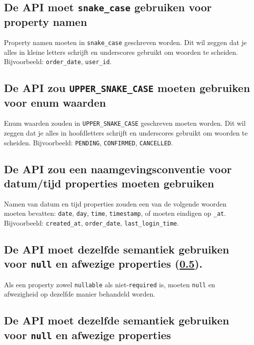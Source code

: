 \subsection{De API moet \texttt{snake\_case} gebruiken voor property namen}
\label{subsection:snake_case_property_namen}

Property namen moeten in \texttt{snake\_case} geschreven worden. Dit wil zeggen dat je alles in kleine letters schrijft en underscores gebruikt om woorden te scheiden. Bijvoorbeeld: \texttt{order\_date}, \texttt{user\_id}.

\subsection{De API zou \texttt{UPPER\_SNAKE\_CASE} moeten gebruiken voor enum waarden}
\label{subsection:upper_snake_case_enum}

Enum waarden zouden in \texttt{UPPER\_SNAKE\_CASE} geschreven moeten worden. Dit wil zeggen dat je alles in hoofdletters schrijft en underscores gebruikt om woorden te scheiden. Bijvoorbeeld: \texttt{PENDING}, \texttt{CONFIRMED}, \texttt{CANCELLED}.

\subsection{De API zou een naamgevingsconventie voor datum/tijd properties moeten gebruiken}
\label{subsection:naamgevingsconventie_datum_tijd}

Namen van datum en tijd properties zouden een van de volgende woorden moeten bevatten: \texttt{date}, \texttt{day}, \texttt{time}, \texttt{timestamp}, of moeten eindigen op \texttt{\_at}. Bijvoorbeeld: \texttt{created\_at}, \texttt{order\_date}, \texttt{last\_login\_time}.

\subsection{De API moet dezelfde semantiek gebruiken voor \texttt{null} en afwezige properties (\ref{subsection:null_afwezige_properties}).}

Als een property zowel \texttt{nullable} als niet-\texttt{required} is, moeten \texttt{null} en afwezigheid op dezelfde manier behandeld worden.

\subsection{De API moet dezelfde semantiek gebruiken voor \texttt{null} en afwezige properties}
\label{subsection:null_afwezige_properties}

